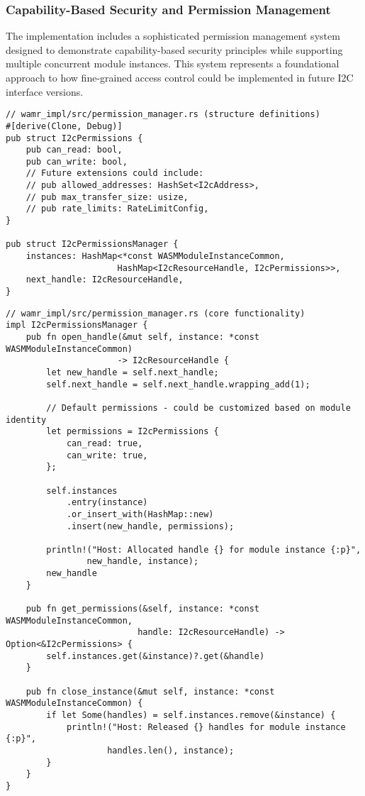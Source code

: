 \subsubsection{Capability-Based Security and Permission Management}

The implementation includes a sophisticated permission management system designed to demonstrate capability-based security principles while supporting multiple concurrent module instances. This system represents a foundational approach to how fine-grained access control could be implemented in future I2C interface versions.

\begin{verbatim}
// wamr_impl/src/permission_manager.rs (structure definitions)
#[derive(Clone, Debug)]
pub struct I2cPermissions {
    pub can_read: bool,
    pub can_write: bool,
    // Future extensions could include:
    // pub allowed_addresses: HashSet<I2cAddress>,
    // pub max_transfer_size: usize,
    // pub rate_limits: RateLimitConfig,
}

pub struct I2cPermissionsManager {
    instances: HashMap<*const WASMModuleInstanceCommon, 
                      HashMap<I2cResourceHandle, I2cPermissions>>,
    next_handle: I2cResourceHandle,
}
\end{verbatim}

\begin{verbatim}
// wamr_impl/src/permission_manager.rs (core functionality)
impl I2cPermissionsManager {
    pub fn open_handle(&mut self, instance: *const WASMModuleInstanceCommon) 
                      -> I2cResourceHandle {
        let new_handle = self.next_handle;
        self.next_handle = self.next_handle.wrapping_add(1);
        
        // Default permissions - could be customized based on module identity
        let permissions = I2cPermissions {
            can_read: true,
            can_write: true,
        };
        
        self.instances
            .entry(instance)
            .or_insert_with(HashMap::new)
            .insert(new_handle, permissions);
            
        println!("Host: Allocated handle {} for module instance {:p}", 
                new_handle, instance);
        new_handle
    }

    pub fn get_permissions(&self, instance: *const WASMModuleInstanceCommon, 
                          handle: I2cResourceHandle) -> Option<&I2cPermissions> {
        self.instances.get(&instance)?.get(&handle)
    }

    pub fn close_instance(&mut self, instance: *const WASMModuleInstanceCommon) {
        if let Some(handles) = self.instances.remove(&instance) {
            println!("Host: Released {} handles for module instance {:p}", 
                    handles.len(), instance);
        }
    }
}
\end{verbatim}

